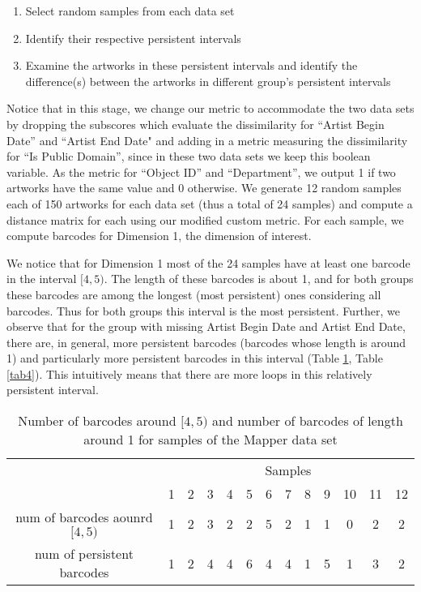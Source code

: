 \documentclass[12pt]{article}
\theoremstyle{definition}
\begin{document}
\begin{enumerate}
\item Select random samples from each data set
\item Identify their respective persistent intervals
\item Examine the artworks in these persistent intervals and identify the difference(s) between the artworks in different group's persistent intervals
\end{enumerate}
\par Notice that in this stage, we change our metric to accommodate the two data sets by dropping the subscores which evaluate the dissimilarity for ``Artist Begin Date'' and ``Artist End Date" and adding in a metric measuring the dissimilarity for ``Is Public Domain'', since in these two data sets we keep this boolean variable. As the metric for ``Object ID'' and ``Department'', we output 1 if two artworks have the same value and 0 otherwise. We generate 12 random samples each of 150 artworks for each data set (thus a total of 24 samples) and compute a distance matrix for each using our modified custom metric. For each sample, we compute barcodes for Dimension 1, the dimension of interest.
\par We notice that for Dimension 1 most of the 24 samples have at least one barcode in the interval $[4, 5)$. The length of these barcodes is about 1, and for both groups these barcodes are among the longest (most persistent) ones considering all barcodes. Thus for both groups this interval is the most persistent. Further, we observe that for the group with missing Artist Begin Date and Artist End Date, there are, in general, more persistent barcodes (barcodes whose length is around 1) and particularly more persistent barcodes in this interval (Table \ref{tab3}, Table \ref{tab4}). This intuitively means that there are more loops in this relatively persistent interval. 
\begin{table}[!htbp]
        \centering
        \begin{tabular}{c|c|c|c|c|c|c|c|c|c|c|c|c|}
            \cline{2-13}
             & \multicolumn{12}{|c|}{Samples}\\
            \cline{2-13}
             & 1 & 2 & 3 & 4 & 5 & 6 & 7 & 8 & 9 & 10 & 11 & 12 \\
            \hline
            \multicolumn{1}{|c|}{num of barcodes aounrd $[4, 5)$} & 1 & 2 & 3 & 2 & 2 & 5 & 2 & 1 & 1 & 0 & 2 & 2 \\
            \hline
            \multicolumn{1}{|c|}{num of persistent barcodes} & 1 & 2 & 4 & 4 & 6 & 4 & 4 & 1 & 5 & 1 & 3 & 2 \\
            \hline
        \end{tabular}
        \caption{Number of barcodes around $[4,5)$  and number of barcodes of length around 1 for samples of the Mapper data set}
        \label{tab3}
    \end{table}
\end{document}
